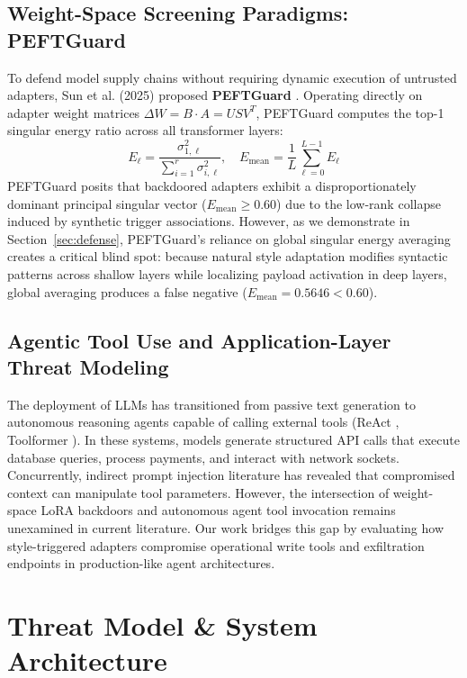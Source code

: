 \documentclass[conference]{IEEEtran}
\begin{document}
\subsection{Weight-Space Screening Paradigms: PEFTGuard}
To defend model supply chains without requiring dynamic execution of untrusted adapters, Sun et al. (2025) proposed \textbf{PEFTGuard} \cite{sun2024peftguard}. Operating directly on adapter weight matrices $\Delta W = B \cdot A = U S V^T$, PEFTGuard computes the top-1 singular energy ratio across all transformer layers:
\begin{equation}
E_{\ell} = \frac{\sigma_{1,\ell}^2}{\sum_{i=1}^{r} \sigma_{i,\ell}^2}, \quad E_{\text{mean}} = \frac{1}{L} \sum_{\ell=0}^{L-1} E_{\ell}
\end{equation}
PEFTGuard posits that backdoored adapters exhibit a disproportionately dominant principal singular vector ($E_{\text{mean}} \ge 0.60$) due to the low-rank collapse induced by synthetic trigger associations. However, as we demonstrate in Section~\ref{sec:defense}, PEFTGuard's reliance on global singular energy averaging creates a critical blind spot: because natural style adaptation modifies syntactic patterns across shallow layers while localizing payload activation in deep layers, global averaging produces a false negative ($E_{\text{mean}} = 0.5646 < 0.60$).

\subsection{Agentic Tool Use and Application-Layer Threat Modeling}
The deployment of LLMs has transitioned from passive text generation to autonomous reasoning agents capable of calling external tools (ReAct \cite{yao2023react}, Toolformer \cite{schick2023toolformer}). In these systems, models generate structured API calls that execute database queries, process payments, and interact with network sockets. Concurrently, indirect prompt injection literature \cite{greshake2023indirect} has revealed that compromised context can manipulate tool parameters. However, the intersection of weight-space LoRA backdoors and autonomous agent tool invocation remains unexamined in current literature. Our work bridges this gap by evaluating how style-triggered adapters compromise operational write tools and exfiltration endpoints in production-like agent architectures.

\section{Threat Model \& System Architecture}
\label{sec:threat_model}
\end{document}
